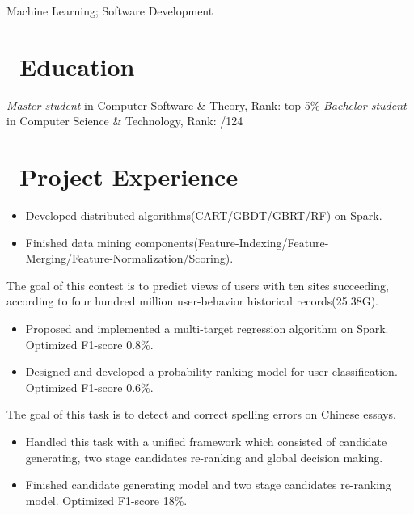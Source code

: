 \documentclass{resume}
\begin{document}

\centerline{Machine Learning; Software Development}
\vspace{2ex}

 
\section{\faGraduationCap\ Education}
\textit{Master student} in Computer Software \& Theory, Rank: top 5\%
\textit{Bachelor student} in Computer Science \& Technology, Rank: /124

\section{\faUsers\ Project Experience}

\begin{itemize}
  \item  Developed distributed algorithms(CART/GBDT/GBRT/RF) on Spark.
  \item Finished data mining components(Feature-Indexing/Feature-Merging/Feature-Normalization/Scoring).
\end{itemize}

The goal of this contest is to predict views of users with ten sites succeeding, according to four hundred million user-behavior historical records(25.38G).
\begin{itemize}
  \item Proposed and implemented a multi-target regression algorithm on Spark. Optimized F1-score 0.8\%.
  \item Designed and developed a probability ranking model for user classification. Optimized F1-score  0.6\%.
\end{itemize}

The goal of this task is to detect and correct spelling errors on Chinese essays.
\begin{itemize}
  \item Handled this task with a unified framework which consisted of candidate generating, two stage candidates re-ranking and global decision making.
  \item Finished candidate generating model and two stage candidates re-ranking model. Optimized F1-score 18\%.
\end{itemize}
\end{document}
